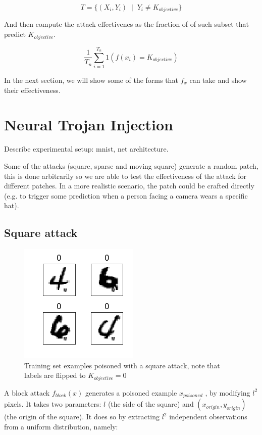\documentclass[letterpaper, 10 pt, conference]{ieeeconf}  %
\begin{document}
$$T = \{(X_i, Y_i) \;\;|\;\;Y_i  \neq K_{objective}\}$$

And then compute the attack effectivenes as the fraction of of such subset that predict $K_{objective}$.

$$\frac{1}{T_n} \sum_{i=1}^{T_n} 1(f(x_i) = K_{objective})$$

In the next section, we will show some of the forms that $f_x$ can take and show their effectiveness.


\section{Neural Trojan Injection}

Describe experimental setup: mnist, net architecture.

Some of the attacks (square, sparse and moving square) generate a random patch,
this is done arbitrarily so we are able to test the effectiveness of the attack
for different patches. In a more realistic scenario, the patch could be
crafted directly (e.g. to trigger some prediction when a person facing a camera
wears a specific hat).

\subsection{Square attack}

\begin{figure}[h]
\caption{Training set examples poisoned with a square attack, note that labels are flipped to $K_{objective}=0$}
\centering
\includegraphics{square.png}
\end{figure}


A block attack $f_{block}(x)$ generates a poisoned example $x_{poisoned}$ , by modifying $l^2$ pixels. It takes two parameters: $l$ (the side of the square) and $(x_{origin}, y_{origin})$ (the origin of the square). It does so by extracting $l^2$ independent observations from a uniform distribution, namely:
\end{document}
